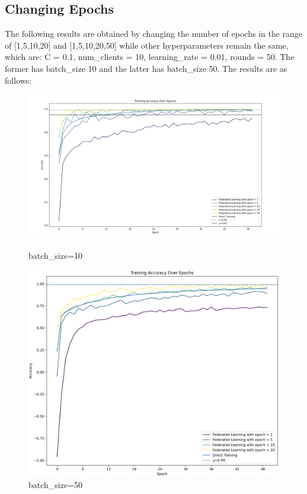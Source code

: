 \documentclass[a4paper,12pt]{article}
\begin{document}
\subsection{Changing Epochs}
The following results are obtained by changing the number of epochs in the range of 
[1,5,10,20] and [1,5,10,20,50] while other hyperparameters remain the same, which are:
C = 0.1, num\_clients = 10, learning\_rate = 0.01, rounds = 50. The former has batch\_size 10 and 
the latter has batch\_size 50. The results are as follows:
\begin{figure}[htbp]
    \centering
    \begin{minipage}[t]{0.59\textwidth}
        \centering
        \includegraphics[width=1\textwidth]{batch10_epoch_change.png} %
	      \vspace{-0.8cm}
        \caption{batch\_size=10}
    \end{minipage}
    \hfill
    \begin{minipage}[t]{0.4\textwidth}
        \centering
        \includegraphics[width=1\textwidth]{batch64_epoch_change.png} %
	      \vspace{-0.8cm}
        \caption{batch\_size=50}
\end{minipage}


\end{figure}
\end{document}
